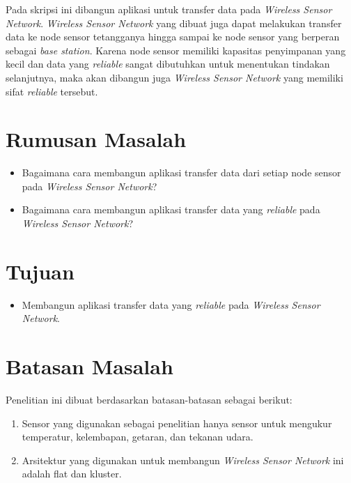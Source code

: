 Pada skripsi ini dibangun aplikasi untuk transfer data pada \textit{Wireless Sensor Network}. \textit{Wireless Sensor Network} yang dibuat juga dapat melakukan transfer data ke node sensor tetangganya hingga sampai ke node sensor yang berperan sebagai \textit{base station}. Karena node sensor memiliki kapasitas penyimpanan yang kecil dan data yang \textit{reliable} sangat dibutuhkan untuk menentukan tindakan selanjutnya, maka akan dibangun juga \textit{Wireless Sensor Network} yang memiliki sifat \textit{reliable} tersebut.


\section{Rumusan Masalah}
\label{sec:rumusan}
\begin{itemize}
	\item Bagaimana cara membangun aplikasi transfer data dari setiap node sensor pada \textit{Wireless Sensor Network}?
	\item Bagaimana cara membangun aplikasi transfer data yang \textit{reliable} pada \textit{Wireless Sensor Network}?
\end{itemize}

\section{Tujuan}
\label{sec:tujuan}
\begin{itemize}
 \item Membangun aplikasi transfer data yang \textit{reliable} pada \textit{Wireless Sensor Network}.
\end{itemize}

\section{Batasan Masalah}
\label{sec:batasan}
Penelitian ini dibuat berdasarkan batasan-batasan sebagai berikut:
\begin{enumerate}
	\item Sensor yang digunakan sebagai penelitian hanya sensor untuk mengukur temperatur, kelembapan, getaran, dan tekanan udara.
	\item Arsitektur yang digunakan untuk membangun \textit{Wireless Sensor Network} ini adalah flat dan kluster.
\end{enumerate}

